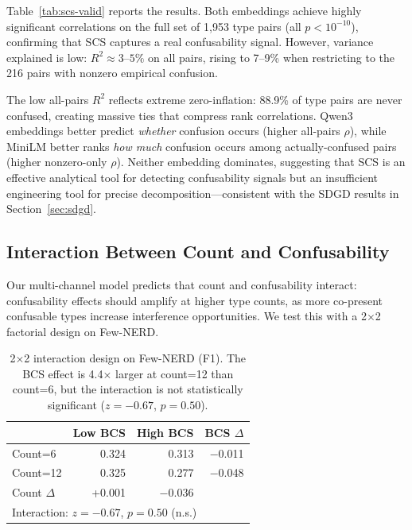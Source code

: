 \documentclass[11pt,a4paper]{article}
\begin{document}
Table~\ref{tab:scs-valid} reports the results. Both embeddings achieve highly significant correlations on the full set of 1,953 type pairs (all $p < 10^{-10}$), confirming that SCS captures a real confusability signal. However, variance explained is low: $R^2 \approx 3$--$5\%$ on all pairs, rising to 7--9\% when restricting to the 216 pairs with nonzero empirical confusion.

The low all-pairs $R^2$ reflects extreme zero-inflation: 88.9\% of type pairs are never confused, creating massive ties that compress rank correlations. Qwen3 embeddings better predict \emph{whether} confusion occurs (higher all-pairs $\rho$), while MiniLM better ranks \emph{how much} confusion occurs among actually-confused pairs (higher nonzero-only $\rho$). Neither embedding dominates, suggesting that SCS is an effective analytical tool for detecting confusability signals but an insufficient engineering tool for precise decomposition---consistent with the SDGD results in Section~\ref{sec:sdgd}.

\subsection{Interaction Between Count and Confusability}
\label{sec:interaction}

Our multi-channel model predicts that count and confusability interact: confusability effects should amplify at higher type counts, as more co-present confusable types increase interference opportunities. We test this with a 2$\times$2 factorial design on Few-NERD.

\begin{table}[t]
\centering
\caption{2$\times$2 interaction design on Few-NERD (F1). The BCS effect is 4.4$\times$ larger at count=12 than count=6, but the interaction is not statistically significant ($z{=}{-}0.67$, $p{=}0.50$).}
\label{tab:interaction}
\begin{tabular}{lrrr}
\toprule
             & Low BCS & High BCS & BCS $\Delta$ \\
\midrule
Count=6      & 0.324   & 0.313    & $-$0.011 \\
Count=12     & 0.325   & 0.277    & $-$0.048 \\
\midrule
Count $\Delta$ & +0.001  & $-$0.036 & \\
\bottomrule
\multicolumn{4}{l}{\small Interaction: $z{=}{-}0.67$, $p{=}0.50$ (n.s.)} \\
\end{tabular}
\end{table}
\end{document}
